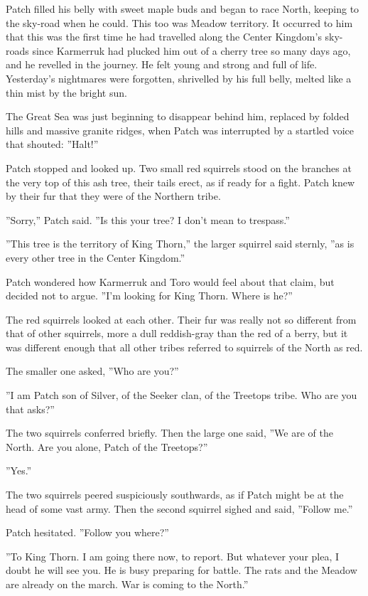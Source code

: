 \documentclass[12pt]{book}
\begin{document}
Patch filled his belly with sweet maple buds and began to race North, keeping to the sky-road when he could. This too was Meadow territory. It occurred to him that this was the first time he had travelled along the Center Kingdom's sky-roads since Karmerruk had plucked him out of a cherry tree so many days ago, and he revelled in the journey. He felt young and strong and full of life. Yesterday's nightmares were forgotten, shrivelled by his full belly, melted like a thin mist by the bright sun.

The Great Sea was just beginning to disappear behind him, replaced by folded hills and massive granite ridges, when Patch was interrupted by a startled voice that shouted: ''Halt!''

Patch stopped and looked up. Two small red squirrels stood on the branches at the very top of this ash tree, their tails erect, as if ready for a fight. Patch knew by their fur that they were of the Northern tribe.

''Sorry,'' Patch said. ''Is this your tree? I don't mean to trespass.''

''This tree is the territory of King Thorn,'' the larger squirrel said sternly, ''as is every other tree in the Center Kingdom.''

Patch wondered how Karmerruk and Toro would feel about that claim, but decided not to argue. ''I'm looking for King Thorn. Where is he?''

The red squirrels looked at each other. Their fur was really not so different from that of other squirrels, more a dull reddish-gray than the red of a berry, but it was different enough that all other tribes referred to squirrels of the North as red.

The smaller one asked, ''Who are you?''

''I am Patch son of Silver, of the Seeker clan, of the Treetops tribe. Who are you that asks?''

The two squirrels conferred briefly. Then the large one said, ''We are of the North. Are you alone, Patch of the Treetops?''

''Yes.''

The two squirrels peered suspiciously southwards, as if Patch might be at the head of some vast army. Then the second squirrel sighed and said, ''Follow me.''

Patch hesitated. ''Follow you where?''

''To King Thorn. I am going there now, to report. But whatever your plea, I doubt he will see you. He is busy preparing for battle. The rats and the Meadow are already on the march. War is coming to the North.''
\end{document}

